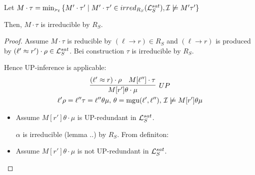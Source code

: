 \documentclass[%
]{beamer}
\begin{document}
\begin{frame}[allowframebreaks]


    \begin{lemma}
        Let $M\cdot\tau = \min_{\mathrel\succ_{\!\ell}}
         \left\{
             M'\cdot\tau' \mid
             M'\cdot\tau' \in irred_{R_S}(\mathcal{L}_S^{sat}),
             \mathcal{I} \not\models M'\tau'
         \right\}$

        Then, $M\cdot\tau$ is irreducible by $R_S$.
    \end{lemma}



    \begin{proof}
        Assume $M\cdot\tau$ is reducible by $(\ell\to r)\in R_S$
        and $(\ell\to r)$ is produced by $(\ell'\approx r')\cdot\rho\in\mathcal{L}_S^{sat}$.
        Bei construction $\tau$ is irreducible by $R_S$.

        Hence UP-inference is applicable:
        \begin{gather*}
            \infer[UP]
            {M[r']\theta\cdot\mu}
            {(\ell'\mEQ r)\cdot\rho & M[\ell'']\cdot\tau}
            \\
            \ell'\rho = \ell''\tau = \ell''\theta\mu,\,
            \theta=\mgu(\ell',\ell''),\,
            \mcI\not\models M[r']\theta\mu
        \end{gather*}

        \begin{itemize}
            \item Assume $M[r']\theta\cdot\mu$ is UP-redundant in $\mathcal{L}_S^{sat}$.

            $\alpha$ is irreducible (lemma ..) by $R_S$. From definiton:
            \item Assume $M[r']\theta\cdot\mu$ is not UP-redundant in $\mathcal{L}_S^{sat}$.
        \end{itemize}
    \end{proof}
\end{frame}
\end{document}
